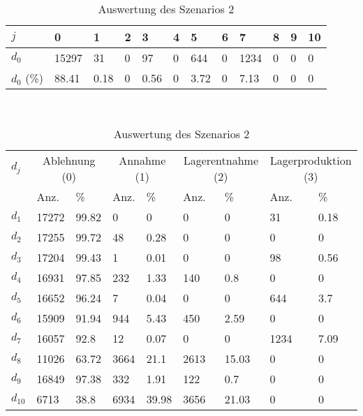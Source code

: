 \begin{table}[h!]
\renewcommand{\arraystretch}{1.5}
  \begin{center}
    \caption{Auswertung des Szenarios 2}  \label{AS2}
    \vspace*{3mm}
    \begin{tabular}{l l l l l l l l l l l l }  \hline 
         $j$ & 0 & 1  & 2 & 3 & 4  & 5 & 6 & 7 & 8 & 9 & 10  \\  \hline
$d_{0}$ &  15297 &    31 &  0 &    97 &  0 &   644 &  0 &  1234 &  0 &  0 &  0 \\
$d_{0}$ (\%) &  88.41 &  0.18 &  0 &  0.56 &  0 &  3.72 &  0 &  7.13 &  0 &  0 &  0 \\
\hline
    \end{tabular} \\[3mm]
        \begin{tabular}{ l l l l l l l l l}   \hline    %
    $d_j$ & \multicolumn{2}{c}{Ablehnung (0)} & \multicolumn{2}{c}{Annahme (1)}  & \multicolumn{2}{c}{Lagerentnahme (2)} & \multicolumn{2}{c}{Lagerproduktion (3)}\\
    & Anz. & \% & Anz. & \% & Anz. & \% & Anz. & \% \\ \hline 
$d_{1}$  &  17272 &  99.82 &   0 &    0 &   0 &    0 &    31 &  0.18 \\
$d_{2}$  &  17255 &  99.72 &    48 &   0.28 &   0 &    0 &   0 &   0 \\
$d_{3}$  &  17204 &  99.43 &     1 &   0.01 &   0 &    0 &    98 &  0.56 \\
$d_{4}$  &  16931 &  97.85 &   232 &   1.33 &   140 &    0.8 &   0 &   0 \\
$d_{5}$  &  16652 &  96.24 &     7 &   0.04 &   0 &    0 &   644 &   3.7 \\
$d_{6}$  &  15909 &  91.94 &   944 &   5.43 &   450 &   2.59 &   0 &   0 \\
$d_{7}$  &  16057 &   92.8 &    12 &   0.07 &   0 &    0 &  1234 &  7.09 \\
$d_{8}$  &  11026 &  63.72 &  3664 &   21.1 &  2613 &  15.03 &   0 &   0 \\
$d_{9}$  &  16849 &  97.38 &   332 &   1.91 &   122 &    0.7 &   0 &   0 \\
$d_{10}$ &   6713 &   38.8 &  6934 &  39.98 &  3656 &  21.03 &   0 &   0 \\
          \hline
   \end{tabular} \\[3mm]
     \end{center}
\end{table}

